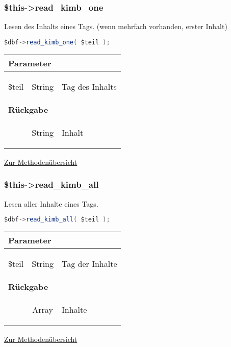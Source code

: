 \documentclass[paper=A4,pagesize=auto,12pt,headinclude=true,footinclude=true,BCOR=0mm,DIV=calc]{scrartcl}
\begin{document}
  \subsubsection{\$this->read\_kimb\_one}
  \label{sec:mth_one_read}
	    Lesen des Inhalts eines Tags. (wenn mehrfach vorhanden, erster Inhalt)
	    \begin{lstlisting}[gobble=4,language=Java]
	      $dbf->read_kimb_one( $teil );
	    \end{lstlisting}
	    
	    \begin{tabular}{|lcp{}|}
		    \hline
		      \multicolumn{3}{|l|}{ \textbf{Parameter} } \\
		    \hline
		      \$teil & String & \begin{itshape} Tag des Inhalts \end{itshape} \\
		    \hline
		      \multicolumn{3}{|l|}{ \textbf{Rückgabe} } \\
		    \hline
			     & String & \begin{itshape} Inhalt \end{itshape} \\
		    \hline
	    \end{tabular}
	    \begin{flushright} \small \hyperref[tab:methodenuerbersicht]{Zur Methodenübersicht} \end{flushright}
  
  \subsubsection{\$this->read\_kimb\_all}
  \label{sec:mth_all}
	    Lesen aller Inhalte eines Tags.
	    \begin{lstlisting}[gobble=4,language=Java]
	      $dbf->read_kimb_all( $teil );
	    \end{lstlisting}
	    
	    \begin{tabular}{|lcp{}|}
		    \hline
		      \multicolumn{3}{|l|}{ \textbf{Parameter} } \\
		    \hline
		      \$teil & String & \begin{itshape} Tag der Inhalte \end{itshape} \\
		    \hline
		      \multicolumn{3}{|l|}{ \textbf{Rückgabe} } \\
		    \hline
			     & Array & \begin{itshape} Inhalte \end{itshape} \\
		    \hline
	    \end{tabular}
	    \begin{flushright} \small \hyperref[tab:methodenuerbersicht]{Zur Methodenübersicht} \end{flushright}
  
\end{document}
